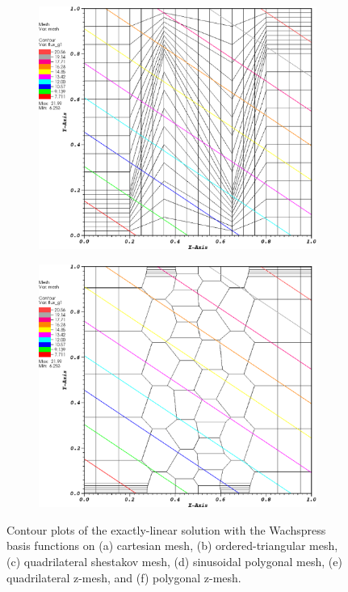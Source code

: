 \begin{figure}
\begin{subfigure}[b]{0.45\textwidth}
		\caption{}
	\end{subfigure}
	\vfill
	\begin{subfigure}[b]{0.45\textwidth}
		\centering
		\label{subfig::z_quad_wach_lin_sol}
		\includegraphics[width=\textwidth]{figures/sec_BF/z_quad_WACHSPRESS_k1.eps}
		\caption{}
	\end{subfigure}
	\hfill
	\begin{subfigure}[b]{0.45\textwidth}
		\centering
		\label{subfig::z_poly_wach_lin_sol}
		\includegraphics[width=\textwidth]{figures/sec_BF/z_poly_WACHSPRESS_k1.eps}
		\caption{}
	\end{subfigure}
\caption{Contour plots of the exactly-linear solution with the Wachspress basis functions on (a) cartesian mesh, (b) ordered-triangular mesh, (c) quadrilateral shestakov mesh, (d) sinusoidal polygonal mesh, (e) quadrilateral z-mesh, and (f) polygonal z-mesh.}
\label{fig::BF_Results_Linear_wach_sol}
\end{figure}

